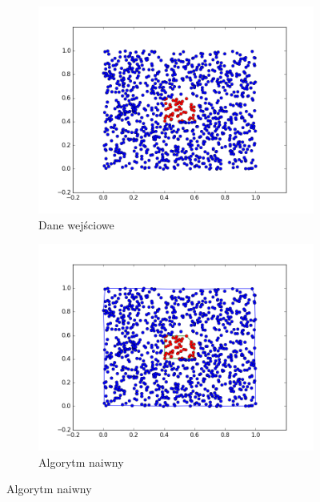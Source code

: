 \begin{figure}[h!]
    \centering
    \begin{subfigure}[b]{0.5\linewidth}
        \includegraphics[width=\linewidth]{img/test1_1.png}
		\caption{Dane wejściowe}
    \end{subfigure}%
    \begin{subfigure}[b]{0.5\linewidth}
        \includegraphics[width=\linewidth]{img/test1_2.png}
		\caption{Algorytm naiwny}
    \end{subfigure}%


\end{figure}
